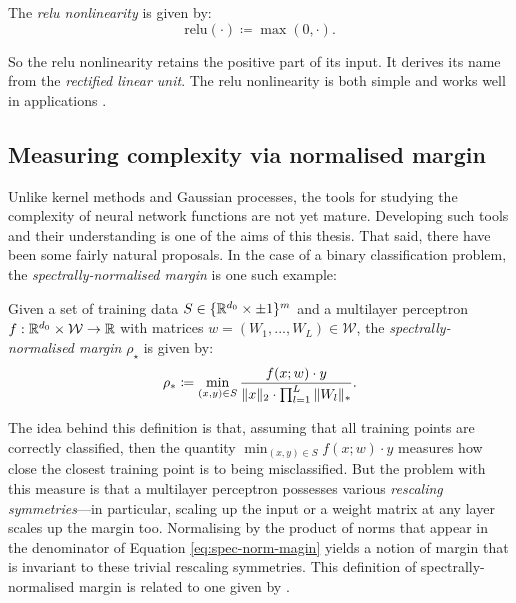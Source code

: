 \begin{refsection}
\begin{definition} The \textit{relu nonlinearity} is given by:
\begin{equation}
    \mathrm{relu}(\cdot) \coloneqq \max(0,\cdot).
\end{equation}
\end{definition}

So the relu nonlinearity retains the positive part of its input. It derives its name from the \textit{rectified linear unit}. The relu nonlinearity is both simple and works well in applications \citep{relu}.

\subsection{Measuring complexity via normalised margin}

Unlike kernel methods and Gaussian processes, the tools for studying the complexity of neural network functions are not yet mature. Developing such tools and their understanding is one of the aims of this thesis. That said, there have been some fairly natural proposals. In the case of a binary classification problem, the \textit{spectrally-normalised margin} is one such example:

\begin{definition}\label{def:spec-norm-margin} Given a set of training data $S \in \{\mathbb{R}^{d_0}\times\pm 1\}^m$ and a multilayer perceptron $f:\mathbb{R}^{d_0}\times \mathcal{W}\to\mathbb{R}$ with matrices $w=(W_1,...,W_L)\in\mathcal{W}$, the \textit{spectrally-normalised margin} $\rho_\star$ is given by:
\begin{equation}\label{eq:spec-norm-magin}
    \rho_* \coloneqq \min_{(x,y)\in S} \frac{f(x;w)\cdot y}{\Vert {x} \Vert_2\cdot\prod_{l=1}^L \Vert {W_l} \Vert_*}.
\end{equation}
\end{definition}

The idea behind this definition is that, assuming that all training points are correctly classified, then the quantity $\min_{(x,y)\in S} f(x;w)\cdot y$ measures how close the closest training point is to being misclassified. But the problem with this measure is that a multilayer perceptron possesses various \textit{rescaling symmetries}---in particular, scaling up the input or a weight matrix at any layer scales up the margin too. Normalising by the product of norms that appear in the denominator of Equation \ref{eq:spec-norm-magin} yields a notion of margin that is invariant to these trivial rescaling symmetries. This definition of spectrally-normalised margin is related to one given by \citet{bartlett}.


\end{refsection}
